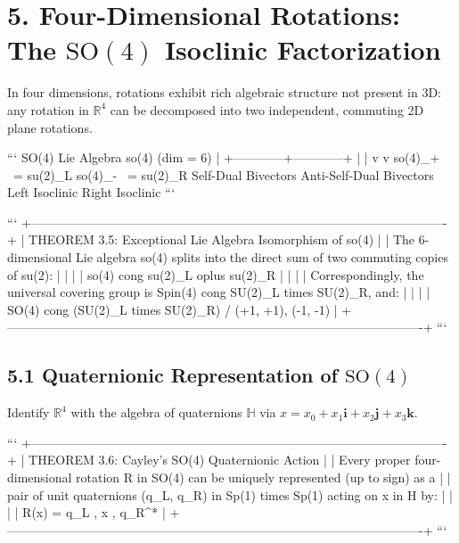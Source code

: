 \documentclass[11pt,twoside,openright]{amsbook}
\begin{document}
{{{{{{\section{5. Four-Dimensional Rotations: The $\mathrm{SO}(4)$ Isoclinic Factorization}

In four dimensions, rotations exhibit rich algebraic structure not present in 3D: any rotation in $\mathbb{R}^4$ can be decomposed into two independent, commuting 2D plane rotations.

```
       SO(4) Lie Algebra so(4)  (dim = 6)
                  |
     +------------+------------+
     |                         |
     v                         v
  so(4)_+ ~= su(2)_L        so(4)_- ~= su(2)_R
  Self-Dual Bivectors       Anti-Self-Dual Bivectors
  Left Isoclinic            Right Isoclinic
```

```
+----------------------------------------------------------------------------------------------------+
| THEOREM 3.5: Exceptional Lie Algebra Isomorphism of so(4)                                          |
| The 6-dimensional Lie algebra so(4) splits into the direct sum of two commuting copies of su(2):   |
|                                                                                                    |
|   so(4) cong su(2)_L oplus su(2)_R                                                                 |
|                                                                                                    |
| Correspondingly, the universal covering group is Spin(4) cong SU(2)_L times SU(2)_R, and:          |
|                                                                                                    |
|   SO(4) cong (SU(2)_L times SU(2)_R) / { (+1, +1), (-1, -1) }                                      |
+----------------------------------------------------------------------------------------------------+
```

\subsection{5.1 Quaternionic Representation of $\mathrm{SO}(4)$}

Identify $\mathbb{R}^4$ with the algebra of quaternions $\mathbb{H}$ via $x = x_0 + x_1 \mathbf{i} + x_2 \mathbf{j} + x_3 \mathbf{k}$.

```
+----------------------------------------------------------------------------------------------------+
| THEOREM 3.6: Cayley's SO(4) Quaternionic Action                                                    |
| Every proper four-dimensional rotation R in SO(4) can be uniquely represented (up to sign) as a   |
| pair of unit quaternions (q_L, q_R) in Sp(1) times Sp(1) acting on x in H by:                     |
|                                                                                                    |
|   R(x) = q_L , x , q_R^*                                                                           |
+----------------------------------------------------------------------------------------------------+
```

}}}}}}
\end{document}
